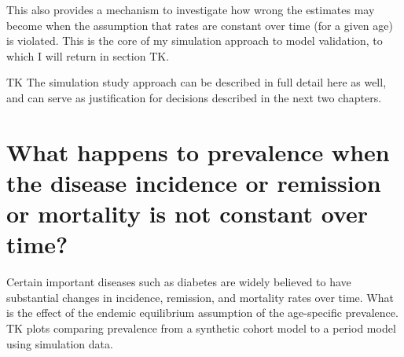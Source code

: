 This also provides a mechanism to investigate how wrong the estimates
may become when the assumption that rates are constant over time (for
a given age) is violated. This is the core of my simulation approach
to model validation, to which I will return in section TK.

TK The simulation study approach can be described in full detail here
as well, and can serve as justification for decisions described in the
next two chapters.

\section{What happens to prevalence when the disease incidence or remission or mortality is not constant over time?}

Certain important diseases such as diabetes are widely believed to
have substantial changes in incidence, remission, and mortality rates
over time.  What is the effect of the endemic equilibrium assumption
of the age-specific prevalence. TK plots comparing prevalence from a
synthetic cohort model to a period model using simulation data.
